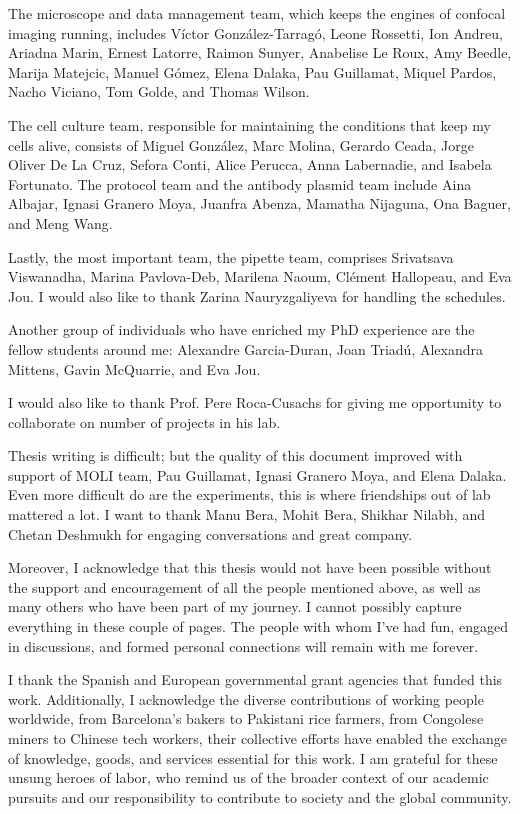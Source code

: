 \begin{Acknowledgements}
	The microscope and data management team, which keeps the engines of confocal imaging running, includes Víctor González-Tarragó, Leone Rossetti, Ion Andreu, Ariadna Marin, Ernest Latorre, Raimon Sunyer, Anabelise Le Roux, Amy Beedle, Marija Matejcic, Manuel Gómez, Elena Dalaka, Pau Guillamat, Miquel Pardos, Nacho Viciano, Tom Golde, and Thomas Wilson.
	
	The cell culture team, responsible for maintaining the conditions that keep my cells alive, consists of Miguel González, Marc Molina, Gerardo Ceada, Jorge Oliver De La Cruz, Sefora Conti, Alice Perucca, Anna Labernadie, and Isabela Fortunato. The protocol team and the antibody plasmid team include Aina Albajar, Ignasi Granero Moya, Juanfra Abenza, Mamatha Nijaguna, Ona Baguer, and Meng Wang.
	
	Lastly, the most important team, the pipette team, comprises Srivatsava Viswanadha, Marina Pavlova-Deb, Marilena Naoum, Clément Hallopeau, and Eva Jou. I would also like to thank Zarina Nauryzgaliyeva for handling the schedules.
	
	Another group of individuals who have enriched my PhD experience are the fellow students around me: Alexandre Garcia-Duran, Joan Triadú, Alexandra Mittens, Gavin McQuarrie, and Eva Jou.
	
	I would also like to thank Prof. Pere Roca-Cusachs for giving me opportunity to collaborate on number of projects in his lab.
	
	Thesis writing is difficult; but the quality of this document improved with support of MOLI team, Pau Guillamat, Ignasi Granero Moya, and Elena Dalaka. Even more difficult do are the experiments, this is where friendships out of lab mattered a lot. I want to thank Manu Bera, Mohit Bera, Shikhar Nilabh, and Chetan Deshmukh for engaging conversations and great company.
	
	Moreover, I acknowledge that this thesis would not have been possible without the support and encouragement of all the people mentioned above, as well as many others who have been part of my journey. I cannot possibly capture everything in these couple of pages. The people with whom I've had fun, engaged in discussions, and formed personal connections will remain with me forever.
	
	I thank the Spanish and European governmental grant agencies that funded this work. Additionally, I acknowledge the diverse contributions of working people worldwide, from Barcelona's bakers to Pakistani rice farmers, from  Congolese miners to Chinese tech workers, their collective efforts have enabled the exchange of knowledge, goods, and services essential for this work. I am grateful for these unsung heroes of labor, who remind us of the broader context of our academic pursuits and our responsibility to contribute to society and the global community.
	

\end{Acknowledgements}
